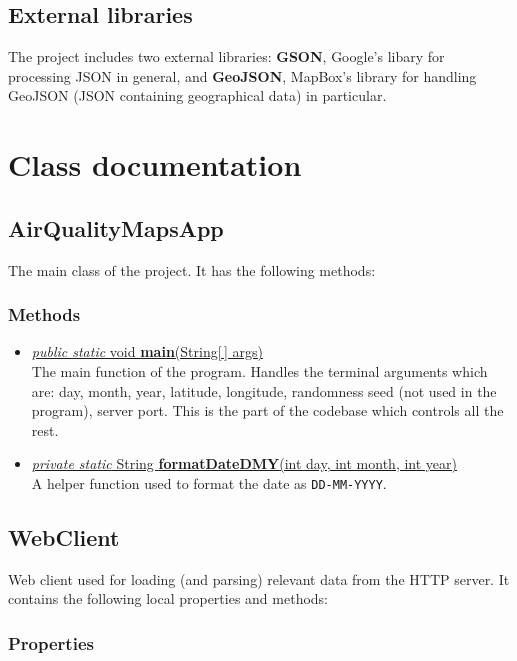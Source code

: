 \documentclass{article}
\newcommand{\method}[4]{\underline{\textit{#1} #2 \textbf{#3}(#4)}}
\begin{document}
\subsection{External libraries}

The project includes two external libraries: \textbf{GSON}, Google's libary for processing JSON in general, and \textbf{GeoJSON}, MapBox's library for handling GeoJSON (JSON containing geographical data) in particular.


\section{Class documentation}
\label{class-documentation}

\subsection{AirQualityMapsApp}
\label{cls:AirQualityMapsApp}

The main class of the project. It has the following methods:

\subsubsection*{Methods}

\begin{itemize}
\item \method{public static}{void}{main}{String[\,] args} \\
  The main function of the program. Handles the terminal arguments which are: day, month, year, latitude, longitude, randomness seed (not used in the program), server port. This is the part of the codebase which controls all the rest.
\item \method{private static}{String}{formatDateDMY}{int day, int month, int year} \\
  A helper function used to format the date as \verb|DD-MM-YYYY|.
\end{itemize}


\subsection{WebClient}
\label{cls:WebClient}

Web client used for loading (and parsing) relevant data from the HTTP server. It contains the following local properties and methods:

\subsubsection*{Properties}
\end{document}
